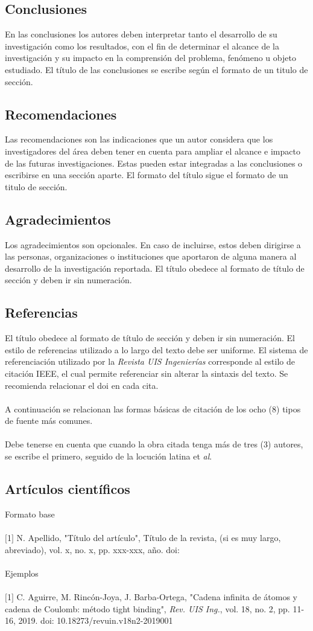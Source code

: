 \documentclass[10pt,letterpaper,twoside,twocolumn]{article}   %
\begin{document}
\subsection{Conclusiones}
En las conclusiones los autores deben interpretar tanto el desarrollo de su investigación como los resultados, con el fin de determinar el alcance de la investigación y su impacto en la comprensión del problema, fenómeno u objeto estudiado. El título de las conclusiones se escribe según el formato de un titulo de sección.
\subsection{Recomendaciones}
Las recomendaciones son las indicaciones que un autor considera que los investigadores del área deben tener en cuenta para ampliar el alcance e impacto de las futuras investigaciones. Estas pueden estar integradas a las conclusiones o escribirse en una sección aparte. El formato del título sigue el formato de un titulo de sección.
\subsection{Agradecimientos}
Los agradecimientos son opcionales. En caso de incluirse, estos deben dirigirse a las personas, organizaciones o instituciones que aportaron de alguna manera al desarrollo de la investigación reportada. El título obedece al formato de título de sección y deben ir sin numeración.
\subsection{Referencias}
El título obedece al formato de título de sección y deben ir sin numeración. El estilo de referencias utilizado a lo largo del texto debe ser uniforme. El sistema de referenciación utilizado por la \textit{Revista UIS Ingenierías} corresponde al estilo de citación IEEE, el cual permite referenciar sin alterar la sintaxis del texto. Se recomienda relacionar el doi en cada cita.\\
\\
A continuación se relacionan las formas básicas de citación de los ocho (8) tipos de fuente más comunes. \\
\\
Debe tenerse en cuenta que cuando la obra citada tenga más de tres (3) autores, se escribe el primero, seguido de la locución latina et \textit{al}.
\subsection*{Artículos científicos}
Formato base\\
\\
$[$1$]$ N. Apellido, "Título del artículo", Título de la revista, (si es muy largo, abreviado), vol. x, no. x, pp. xxx-xxx, año. doi:\\
\\
Ejemplos\\
\\
$[$1$]$ C. Aguirre, M. Rincón-Joya, J. Barba-Ortega, "Cadena infinita de átomos y cadena de Coulomb: método tight binding", \textit{Rev. UIS Ing.}, vol. 18, no. 2, pp. 11-16, 2019. doi: 10.18273/revuin.v18n2-2019001
\end{document}
